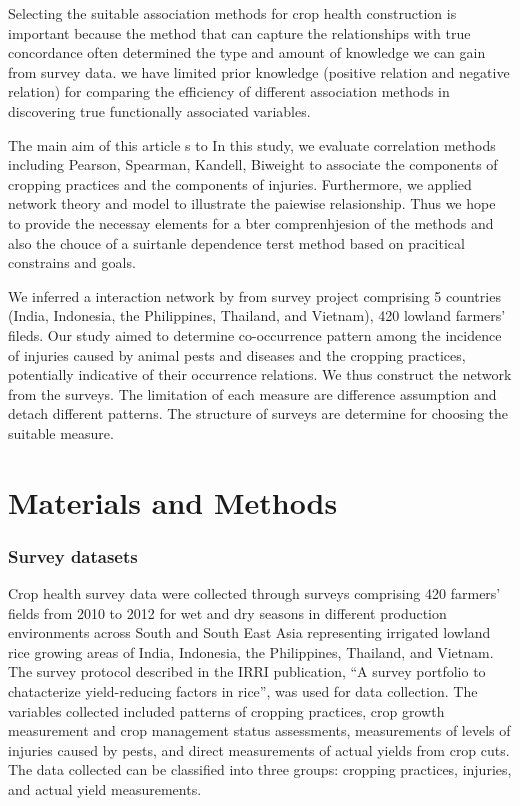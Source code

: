 \documentclass[a4paper]{article}
\begin{document}
Selecting the suitable association methods for crop health construction is important because the method that can capture the relationships with true concordance often determined the type and amount of knowledge we can gain from survey data.
we have limited prior knowledge (positive relation and negative relation) for comparing the efficiency of different association methods in discovering true functionally associated variables.

The main aim of this article s to In this study, we evaluate correlation methods including Pearson, Spearman, Kandell, Biweight to associate the components of cropping practices and the components of injuries. Furthermore, we applied network theory and model to illustrate the paiewise relasionship. Thus we hope to provide the necessay elements for a bter comprenhjesion of the methods and also the chouce of a suirtanle dependence terst method based on pracitical constrains and goals.


We inferred a interaction network by from survey project comprising 5 countries (India, Indonesia, the Philippines, Thailand, and Vietnam), 420 lowland farmers' fileds. Our study aimed to determine co-occurrence pattern among the incidence of injuries caused by animal pests and diseases and the cropping practices, potentially indicative of their occurrence relations. We thus construct the network from the surveys. The limitation of each measure are difference assumption and detach different patterns. The structure of surveys are determine for choosing the suitable measure. 

\section*{Materials and Methods}

\subsubsection*{Survey datasets}
Crop health survey data were collected through surveys comprising 420 farmers' fields from 2010 to 2012 for wet and dry seasons in different production environments across South and South East Asia representing irrigated lowland rice growing areas of India, Indonesia, the Philippines, Thailand, and Vietnam. The survey protocol described in the IRRI publication, ``A survey  portfolio to chatacterize yield-reducing factors in rice'', \citep{Savarysurvey2009} was used for data collection. The variables collected included patterns of cropping practices, crop growth measurement and crop management status assessments, measurements of levels of injuries caused by pests, and direct measurements of actual yields from crop cuts. The data collected can be classified into three groups: cropping practices, injuries, and actual yield measurements.
\end{document}
